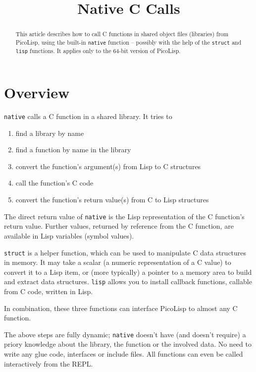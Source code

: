 \title{Native C Calls}

\maketitle



\begin{abstract}
This article describes how to call C functions in shared object files
(libraries) from PicoLisp, using the built-in \texttt{native} function
-- possibly with the help of the \texttt{struct} and \texttt{lisp}
functions. It applies only to the 64-bit version of PicoLisp.
\end{abstract}


\section{Overview}
\label{sec:native-overview}

\texttt{native} calls a C function in a shared library. It tries to

\begin{enumerate}
\item
  find a library by name
\item
  find a function by name in the library
\item
  convert the function's argument(s) from Lisp to C structures
\item
  call the function's C code
\item
  convert the function's return value(s) from C to Lisp structures
\end{enumerate}

The direct return value of \texttt{native} is the Lisp representation of
the C function's return value. Further values, returned by reference
from the C function, are available in Lisp variables (symbol values).

\texttt{struct} is a helper function, which can be used to manipulate C
data structures in memory. It may take a scalar (a numeric
representation of a C value) to convert it to a Lisp item, or (more
typically) a pointer to a memory area to build and extract data
structures. \texttt{lisp} allows you to install callback functions,
callable from C code, written in Lisp.

In combination, these three functions can interface PicoLisp to almost
any C function.

The above steps are fully dynamic; \texttt{native} doesn't have (and
doesn't require) a priory knowledge about the library, the function or
the involved data. No need to write any glue code, interfaces or include
files. All functions can even be called interactively from the REPL.

